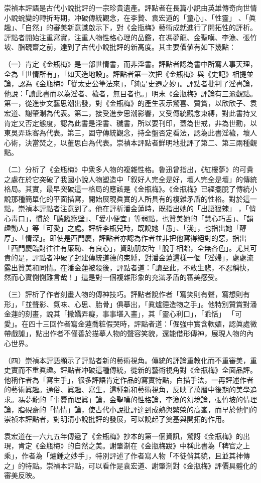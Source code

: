 崇禎本評語是古代小說批評的一宗珍貴遺產。評點者在長篇小說由英雄傳奇向世情小說蛻變的轉折時期，冲破傳統觀念，在李贄、袁宏道的「童心」、「性靈」 、「眞趣」、「自然」的審美新意識啟示下，對《金瓶梅》藝術成就進行了開拓性的評析。評點者開始注重寫實，注重人物性格心理的品鑑，在馮夢龍、金聖嘆、李漁、張竹坡、脂硯齋之前，達到了古代小說批評的新高度。其主要價値有如下幾點：

（一）肯定《金瓶梅》是一部世情書，而非淫書。評點者認為書中所寫人事天理，全為「世情所有」，「如天造地設」。評點者第一次把《金瓶梅》與《史記》相提並論，認為《金瓶梅》「從太史公筆法來」，「純是史遷之妙」。評點者批判了淫書論，他說：「讀此書而以為淫者、穢者，無目者也。」明末《金瓶梅》評論有三派觀點。第一，從進步文藝思潮出發，對《金瓶梅》的產生表示驚喜、贊賞，以欣欣子、袁宏道、謝肇淛為代表。第二，接受進步思潮影響，又受傳統觀念束縛，對此書持又肯定又否定態度，認為此書是淫書、穢書，所以要刊印，蓋為世戒，非為世勸，以東吳弄珠客為代表。第三，固守傳統觀念，持全盤否定看法，認為此書淫穢，壞人心術，決當焚之，以董思白為代表。崇禎本評點者鮮明地批評了第二、第三兩種觀點。

（二）分析了《金瓶梅》中衆多人物的複雜性格。魯迅曾指出，《紅樓夢》的可貴之處在於它突破了我國小說人物塑造中「叙好人完全是好，壞人完全是壞」的傳統格局。其實，最早突破這一格局的應該是《金瓶梅》。《金瓶梅》已經擺脫了傳統小說那種簡單化的平面描寫，開始展現眞實的人所具有的複雜矛盾的性格。對於這一點，崇禎本評點者注意到了。他在評析潘金蓮時，既指出她的「出語狠辣」 ，「俏心毒口」，慣於「聽籬察壁」、「愛小便宜」等弱點，也贊美她的「慧心巧舌」、「韻趣動人」等「可愛」之處。評析李瓶兒時，既說她「愚」、「淺」，也指出她「醇厚」、「情深」。即使是西門慶，評點者亦認為作者並非把他寫得絕對的惡，指出「西門慶臨財往往有廉恥、有良心」，資助朋友時「脫手相贈，全無吝色」。尤其可貴的是，評點者冲破了封建傳統道德的束縛，對潘金蓮這樣一個「淫婦」，處處流露出贊美和同情。在潘金蓮被殺後，評點者道：「讀至此，不敢生悲，不忍稱快，然而心實惻惻難言哉！」這是對一個複雜形象的充滿矛盾的審美感受。

（三）評析了作者刻畫人物的傳神技巧。評點者說作者「寫笑則有聲，寫想則有形」，「並聲影、氣味、心思、胎骨」俱摹出，「眞爐錘造物之手」。他特別贊賞對潘金蓮的刻畫，說其「撒嬌弄癡，事事堪入畫」，其「靈心利口」，「乖恬」 「可愛」。在四十三回作者寫金蓮喬粧假哭時，評點者道：「倔強中實含軟媚，認眞處微帶戲謔」，點出作者不僅善於描摹人物的聲容笑貌，還能借形傳神，展現人物的內心世界。

（四）崇禎本評語顯示了評點者新的藝術視角。傳統的評論重教化而不重審美，重史實而不重眞趣。評點者冲破這種傳統，從新的藝術視角對《金瓶梅》全面品評。他稱作者為「寫生手」，很多評語肯定作品的寫實特點，白描手法，一再評述作者的藝術眞趣。通俗、眞趣、寫生，這種新和藝術視角，反映了萬曆中後期的美學追求。馮夢龍的「事贗而理眞」論，金聖嘆的性格論，李漁的幻境論，張竹坡的情理論，脂硯齋的「情情」論，使古代小說批評達到成熟與繁榮的高峯，而早於他們的崇禎本評點者，對明清小說批評的發展，可以說起了奠基與開拓的作用。

袁宏道在一六九五年傳遞了《金瓶梅》抄本的第一個資訊，驚訝《金瓶梅》的出現，肯定《金瓶梅》的自然之美。謝肇淛在《金瓶梅跋》中稱此書為「稗官之上乘」，作者為「爐錘之妙手」，特別評述了作者寫人物「不徒俏其貌，且並其神傳之」的特點。崇禎本評點，可以看作是袁宏道、謝肇淛對《金瓶梅》評價具體化的審美反映。


